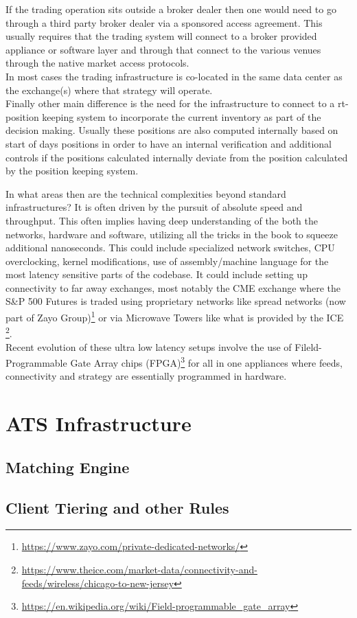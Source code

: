 If the trading operation sits outside a broker dealer then one would need to go through a third party broker dealer via a sponsored access agreement. This usually requires that the trading system will connect to a broker provided appliance or software layer and through that connect to the various venues through the native market access protocols.\\ In most cases the trading infrastructure is co-located in the same data center as the exchange(s) where that strategy will operate.\\

Finally other main difference is the need for the infrastructure to connect to a rt-position keeping system to incorporate the current inventory as part of the decision making. Usually these positions are also computed internally based on start of days positions in order to have an internal verification and additional controls if the positions calculated internally deviate from the position calculated by the position keeping system.

In what areas then are the technical complexities beyond standard infrastructures? It is often driven by the pursuit of absolute speed and throughput. This often implies having deep understanding of the both the networks, hardware and software, utilizing all the tricks in the book to squeeze additional nanoseconds. This could include specialized network switches, CPU overclocking, kernel modifications, use of assembly/machine language for the most latency sensitive parts of the codebase. It could include setting up connectivity to far away exchanges, most notably the CME exchange where the S\&P 500 Futures is traded using proprietary networks like spread networks (now part of Zayo Group)\footnote{\url{https://www.zayo.com/private-dedicated-networks/}} or via Microwave Towers like what is provided by the ICE \footnote{\url{https://www.theice.com/market-data/connectivity-and-feeds/wireless/chicago-to-new-jersey}}.\\ Recent evolution of these ultra low latency setups involve the use of Fileld-Programmable Gate Array chips (FPGA)\footnote{\url{https://en.wikipedia.org/wiki/Field-programmable_gate_array}} for all in one appliances where  feeds, connectivity and strategy are essentially programmed in hardware.\\  

\section{ATS Infrastructure}
\subsection{Matching Engine}
\subsection{Client Tiering and other Rules}

